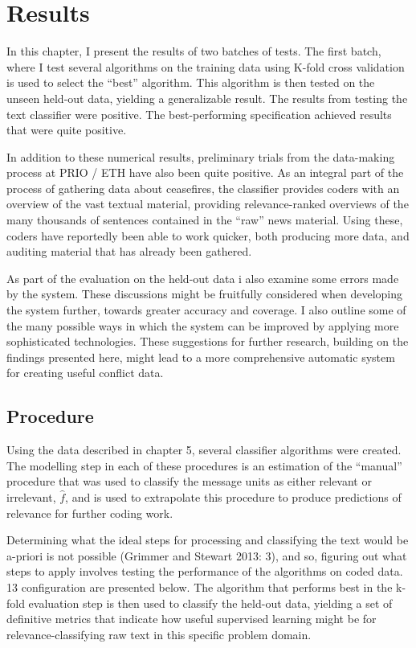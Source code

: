 \documentclass[12pt,twoside]{reedthesis}
\begin{document}
\chapter{Results}\label{results}

In this chapter, I present the results of two batches of tests. The
first batch, where I test several algorithms on the training data using
K-fold cross validation is used to select the ``best'' algorithm. This
algorithm is then tested on the unseen held-out data, yielding a
generalizable result. The results from testing the text classifier were
positive. The best-performing specification achieved results that were
quite positive.

In addition to these numerical results, preliminary trials from the
data-making process at PRIO / ETH have also been quite positive. As an
integral part of the process of gathering data about ceasefires, the
classifier provides coders with an overview of the vast textual
material, providing relevance-ranked overviews of the many thousands of
sentences contained in the ``raw'' news material. Using these, coders
have reportedly been able to work quicker, both producing more data, and
auditing material that has already been gathered.

As part of the evaluation on the held-out data i also examine some
errors made by the system. These discussions might be fruitfully
considered when developing the system further, towards greater accuracy
and coverage. I also outline some of the many possible ways in which the
system can be improved by applying more sophisticated technologies.
These suggestions for further research, building on the findings
presented here, might lead to a more comprehensive automatic system for
creating useful conflict data.

\section{Procedure}\label{procedure}

Using the data described in chapter 5, several classifier algorithms
were created. The modelling step in each of these procedures is an
estimation of the ``manual'' procedure that was used to classify the
message units as either relevant or irrelevant, \(\hat{f}\), and is used
to extrapolate this procedure to produce predictions of relevance for
further coding work.

Determining what the ideal steps for processing and classifying the text
would be a-priori is not possible (Grimmer and Stewart 2013: 3), and so,
figuring out what steps to apply involves testing the performance of the
algorithms on coded data. 13 configuration are presented below. The
algorithm that performs best in the k-fold evaluation step is then used
to classify the held-out data, yielding a set of definitive metrics that
indicate how useful supervised learning might be for
relevance-classifying raw text in this specific problem domain.
\end{document}
